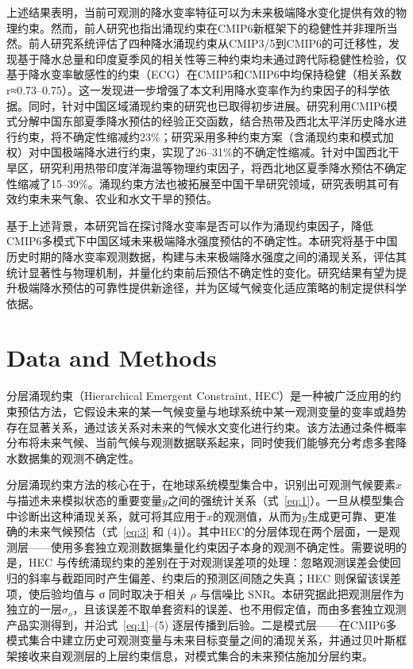 \documentclass[draft]{agujournal2019}
\begin{document}
上述结果表明，当前可观测的降水变率特征可以为未来极端降水变化提供有效的物理约束。然而，前人研究也指出涌现约束在CMIP6新框架下的稳健性并非理所当然。前人研究系统评估了四种降水涌现约束从CMIP3/5到CMIP6的可迁移性，发现基于降水总量和印度夏季风的相关性等三种约束均未通过跨代际稳健性检验，仅基于降水变率敏感性的约束（ECG）在CMIP5和CMIP6中均保持稳健（相关系数r≈0.73--0.75）\cite{ferguglia_robustness_2023}。这一发现进一步增强了本文利用降水变率作为约束因子的科学依据。同时，针对中国区域涌现约束的研究也已取得初步进展。研究利用CMIP6模式分解中国东部夏季降水预估的经验正交函数，结合热带及西北太平洋历史降水进行约束，将不确定性缩减约23\%\cite{zhu_improve_2024}；研究采用多种约束方案（含涌现约束和模式加权）对中国极端降水进行约束，实现了26--31\%的不确定性缩减\cite{zhang_projections_2025}。针对中国西北干旱区，研究利用热带印度洋海温等物理约束因子，将西北地区夏季降水预估不确定性缩减了15--39\%\cite{zhou_comparative_2024}。涌现约束方法也被拓展至中国干旱研究领域，研究表明其可有效约束未来气象、农业和水文干旱的预估\cite{xue_future_2024}。

基于上述背景，本研究旨在探讨降水变率是否可以作为涌现约束因子，降低CMIP6多模式下中国区域未来极端降水强度预估的不确定性。本研究将基于中国历史时期的降水变率观测数据，构建与未来极端降水强度之间的涌现关系，评估其统计显著性与物理机制，并量化约束前后预估不确定性的变化。研究结果有望为提升极端降水预估的可靠性提供新途径，并为区域气候变化适应策略的制定提供科学依据。

\section{Data and Methods}
\label{sec:2}

分层涌现约束（Hierarchical Emergent Constraint, HEC）是一种被广泛应用的约束预估方法\cite{chai_constrained_2025}，它假设未来的某一气候变量与地球系统中某一观测变量的变率或趋势存在显著关系，通过该关系对未来的气候水文变化进行约束。该方法通过条件概率分布将未来气候、当前气候与观测数据联系起来，同时使我们能够充分考虑多套降水数据集的观测不确定性。

分层涌现约束方法的核心\cite{bowman_hierarchical_2018}在于，在地球系统模型集合中，识别出可观测气候要素\(x\)与描述未来模拟状态的重要变量\(y\)之间的强统计关系（式~\eqref{eq:1}）。一旦从模型集合中诊断出这种涌现关系，就可将其应用于\(x\)的观测值，从而为\(y\)生成更可靠、更准确的未来气候预估（式~\eqref{eq:3} 和 (4)）。其中HEC的分层体现在两个层面，一是观测层------使用多套独立观测数据集量化约束因子本身的观测不确定性。需要说明的是，HEC 与传统涌现约束的差别在于对观测误差项的处理：忽略观测误差会使回归的斜率与截距同时产生偏差、约束后的预测区间随之失真\cite{bowman_hierarchical_2018}；HEC 则保留该误差项，使后验均值与 σ 同时取决于相关 \(\rho\) 与信噪比 \(\mathrm{SNR}\)。本研究据此把观测层作为独立的一层\(\sigma_o\)，且该误差不取单套资料的误差、也不用假定值，而由多套独立观测产品实测得到，并沿式~\eqref{eq:1}--(5) 逐层传播到后验\cite{bowman_hierarchical_2018}。二是模式层------在CMIP6多模式集合中建立历史可观测变量与未来目标变量之间的涌现关系，并通过贝叶斯框架接收来自观测层的上层约束信息，对模式集合的未来预估施加分层约束。
\end{document}
